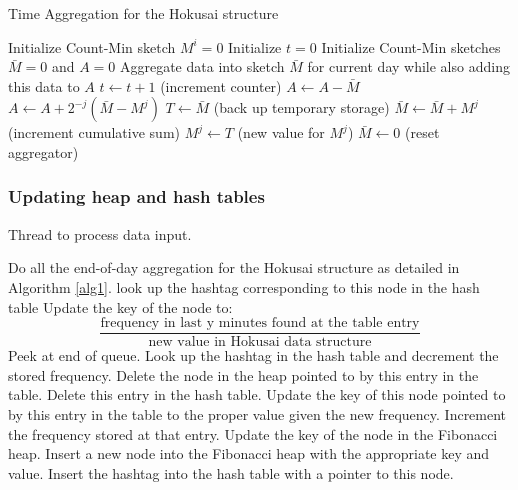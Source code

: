 \documentclass[a4paper,12pt]{article}
\begin{document}
\begin{algorithm}
\caption{Time Aggregation for the Hokusai structure}\label{alg1}
\begin{algorithmic}[1]
	\State Initialize Count-Min sketch $M^i = 0$
\EndFor
\State Initialize $t = 0$
\State Initialize Count-Min sketches $\bar{M} = 0$ and $A = 0$
	\State Aggregate data into sketch $\bar{M}$ for current day while also adding this data to $A$
	\State $t \leftarrow t + 1$ (increment counter)
	\State $A \leftarrow A - \bar{M}$
		\State $A \leftarrow A + 2^{-j}(\bar{M} - M^j)$
		\State $T \leftarrow \bar{M}$ (back up temporary storage)
		\State $\bar{M} \leftarrow \bar{M} + M^j$ (increment cumulative sum)
		\State $M^j \leftarrow T$ (new value for $M^j$)
	\EndFor
	\State $\bar{M} \leftarrow 0$ (reset aggregator)
\EndWhile
\end{algorithmic}
\end{algorithm}

\subsubsection{Updating heap and hash tables}

\begin{algorithm}
\caption{Thread to process data input.}
\begin{algorithmic}[1]
		\State Do all the end-of-day aggregation for the Hokusai structure as detailed in Algorithm \ref{alg1}.
			\State look up the hashtag corresponding to this node in the hash table
			\State Update the key of the node to: \[\frac{\text{frequency in last y minutes found at the table entry}}{\text{new value in Hokusai data structure}}\]
		\EndFor
	\EndIf
		\State Peek at end of queue.
			\State Look up the hashtag in the hash table and decrement the stored frequency.
				\State Delete the node in the heap pointed to by this entry in the table.
				\State Delete this entry in the hash table.
			\Else	
				\State Update the key of this node pointed to by this entry in the table to the proper value given the new frequency.
			\EndIf
		\EndIf
	\EndIf
		\State Increment the frequency stored at that entry.
		\State Update the key of the node in the Fibonacci heap.
	\Else
		\State Insert a new node into the Fibonacci heap with the appropriate key and value. 
		\State Insert the hashtag into the hash table with a pointer to this node.
 	\EndIf
\EndWhile
\end{algorithmic}
\end{algorithm}
\end{document}
